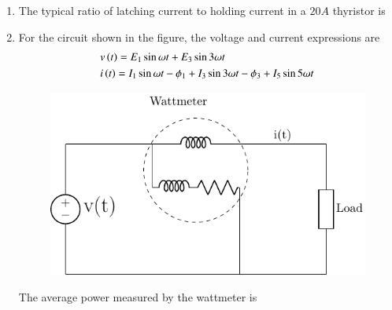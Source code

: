 \documentclass[journal]{IEEEtran}
\begin{document}
\begin{enumerate}
\item The typical ratio of latching current to holding current in a $20 A$ thyristor is
	\begin{enumerate}
\end{enumerate}
\item For the circuit shown in the figure, the voltage and current expressions are
	\begin{align*}
		&v\left(t\right)=E_1\sin{\omega t}+E_3\sin{3\omega t}\\
		&i\left(t\right)=I_1\sin{\omega t-\phi_1}+I_3\sin{3\omega t-\phi_3}+I_5\sin{5\omega t}
	\end{align*}
\begin{figure}[H]
			\centering
			\includegraphics[scale=0.75]{figs/q25.png}
			\label{stemplot}
		\end{figure}
	The average power measured by the wattmeter is
\begin{enumerate}
    \begin{multicols}{2}

\end{multicols}
\end{enumerate}
\end{enumerate}
\end{document}
